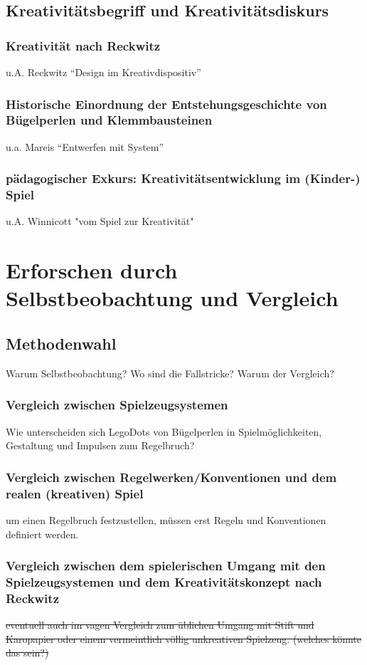 \documentclass[11pt,a4paper,twoside]{scrreprt}
\begin{document}
	\section{Kreativitätsbegriff und Kreativitätsdiskurs}
		\subsection{Kreativität nach Reckwitz}
		u.A. Reckwitz ``Design im Kreativdispositiv''
		\subsection{Historische Einordnung der Entstehungsgeschichte von Bügelperlen und Klemmbausteinen}
		u.a. Mareis ``Entwerfen mit System''
		\subsection{pädagogischer Exkurs: Kreativitätsentwicklung im (Kinder-) Spiel}
		u.A. Winnicott "vom Spiel zur Kreativität"



\chapter{Erforschen durch Selbstbeobachtung und Vergleich}
	\section{Methodenwahl}
	Warum Selbstbeobachtung? Wo sind die Fallstricke? Warum der Vergleich? 
		\subsection{Vergleich zwischen Spielzeugsystemen}
		Wie unterscheiden sich LegoDots von Bügelperlen in Spielmöglichkeiten, Gestaltung und Impulsen zum Regelbruch?
		\subsection{Vergleich zwischen Regelwerken/Konventionen und dem realen (kreativen) Spiel}
		um einen Regelbruch festzustellen, müssen erst Regeln und Konventionen definiert werden.
		\subsection{Vergleich zwischen dem spielerischen Umgang mit den Spielzeugsystemen und dem Kreativitätskonzept nach Reckwitz}
		\sout{eventuell auch im vagen Vergleich zum üblichen Umgang mit Stift und Karopapier oder einem vermeintlich völlig unkreativen Spielzeug. (welches könnte das sein?)}
\end{document}
